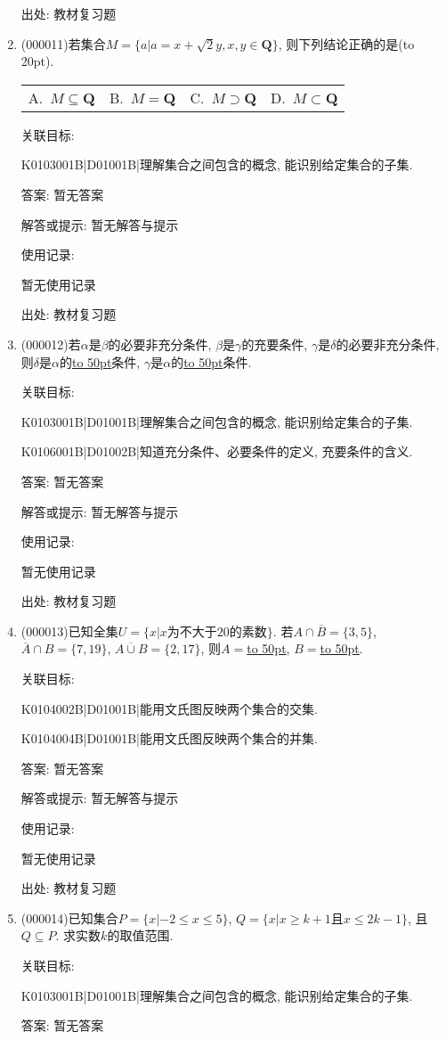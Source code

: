 \documentclass[10pt,a4paper]{article}
\newcommand{\blank}[1]{\underline{\hbox to #1pt{}}}
\newcommand{\bracket}[1]{(\hbox to #1pt{})}
\newcommand{\fourch}[4]{\par\begin{tabular}{p{.23\textwidth}p{.23\textwidth}p{.23\textwidth}p{.23\textwidth}}
A.~#1 &B.~#2& C.~#3& D.~#4
\end{tabular}}
\begin{document}
\begin{enumerate}[1.]
出处: 教材复习题
\item { (000011)}若集合$M=\{a|a=x+\sqrt2y, x,y\in \mathbf{Q}\}$, 则下列结论正确的是\bracket{20}.
\fourch{$M\subseteq \mathbf{Q}$}{$M=\mathbf{Q}$}{$M\supset \mathbf{Q}$}{$M\subset \mathbf{Q}$}


关联目标:

K0103001B|D01001B|理解集合之间包含的概念, 能识别给定集合的子集.

答案: 暂无答案

解答或提示: 暂无解答与提示

使用记录:

暂无使用记录


出处: 教材复习题
\item { (000012)}若$\alpha$是$\beta$的必要非充分条件, $\beta$是$\gamma$的充要条件, $\gamma$是$\delta$的必要非充分条件, 则$\delta$是$\alpha$的\blank{50}条件, $\gamma$是$\alpha$的\blank{50}条件.


关联目标:

K0103001B|D01001B|理解集合之间包含的概念, 能识别给定集合的子集.

K0106001B|D01002B|知道充分条件、必要条件的定义, 充要条件的含义.

答案: 暂无答案

解答或提示: 暂无解答与提示

使用记录:

暂无使用记录


出处: 教材复习题
\item { (000013)}已知全集$U=\{x|x\text{为不大于}20\text{的素数}\}$. 若$A\cap \overline{B}=\{3, 5\}$, $\overline{A}\cap B=\{7, 19\}$, $\overline{A\cup B}=\{2, 17\}$, 则$A=$\blank{50}, $B=$\blank{50}.


关联目标:

K0104002B|D01001B|能用文氏图反映两个集合的交集.

K0104004B|D01001B|能用文氏图反映两个集合的并集.

答案: 暂无答案

解答或提示: 暂无解答与提示

使用记录:

暂无使用记录


出处: 教材复习题
\item { (000014)}已知集合$P=\{x|-2\le x\le 5\}$, $Q=\{x|x\ge k+1\text{且}x\le 2k-1\}$, 且$Q\subseteq P$. 求实数$k$的取值范围.


关联目标:

K0103001B|D01001B|理解集合之间包含的概念, 能识别给定集合的子集.

答案: 暂无答案


\end{enumerate}
\end{document}
